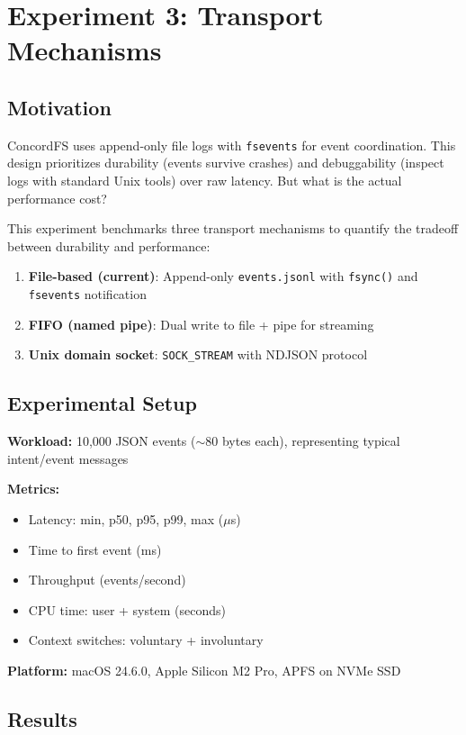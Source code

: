 \documentclass[11pt]{article}
\begin{document}
\section{Experiment 3: Transport Mechanisms}

\subsection{Motivation}

ConcordFS uses append-only file logs with \texttt{fsevents} for event coordination. This design prioritizes durability (events survive crashes) and debuggability (inspect logs with standard Unix tools) over raw latency. But what is the actual performance cost?

This experiment benchmarks three transport mechanisms to quantify the tradeoff between durability and performance:

\begin{enumerate}
\item \textbf{File-based (current)}: Append-only \texttt{events.jsonl} with \texttt{fsync()} and \texttt{fsevents} notification
\item \textbf{FIFO (named pipe)}: Dual write to file + pipe for streaming
\item \textbf{Unix domain socket}: \texttt{SOCK\_STREAM} with NDJSON protocol
\end{enumerate}

\subsection{Experimental Setup}

\textbf{Workload:} 10,000 JSON events ($\sim$80 bytes each), representing typical intent/event messages

\textbf{Metrics:}
\begin{itemize}
\item Latency: min, p50, p95, p99, max ($\mu$s)
\item Time to first event (ms)
\item Throughput (events/second)
\item CPU time: user + system (seconds)
\item Context switches: voluntary + involuntary
\end{itemize}

\textbf{Platform:} macOS 24.6.0, Apple Silicon M2 Pro, APFS on NVMe SSD

\subsection{Results}
\end{document}
